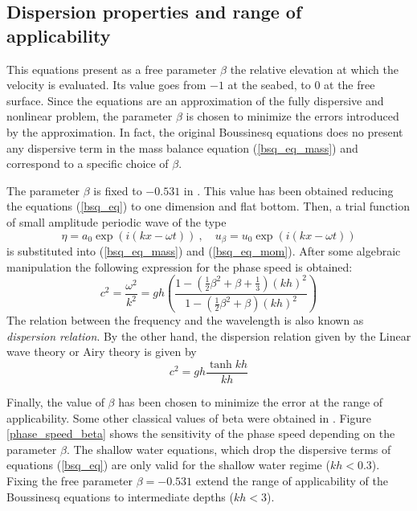 


\subsection{Dispersion properties and range of applicability}

This equations present as a free parameter $\beta$ the relative elevation at which the velocity is evaluated. Its value goes from $-1$ at the seabed, to $0$ at the free surface. Since the equations are an approximation of the fully dispersive and nonlinear problem, the parameter $\beta$ is chosen to minimize the errors introduced by the approximation.
In fact, the original Boussinesq equations does no present any dispersive term in the mass balance equation (\ref{bsq_eq_mass}) and correspond to a specific choice of $\beta$.

The parameter $\beta$ is fixed to $-0.531$ in \cite{nwogu1993}. This value has been obtained reducing the equations (\ref{bsq_eq}) to one dimension and flat bottom. Then, a trial function of small amplitude periodic wave of the type
\begin{equation*}
    \eta = a_0 \exp(i(kx-\omega t)) \ , \quad u_\beta = u_0 \exp(i(kx-\omega t))
\end{equation*}
is substituted into (\ref{bsq_eq_mass}) and (\ref{bsq_eq_mom}). After some algebraic manipulation the following expression for the phase speed is obtained:
\begin{equation}
c^2 = \frac{\omega^2}{k^2} = gh
    \left(\frac{
        1-\left(\frac{1}{2}\beta^2 + \beta + \frac{1}{3}\right)(kh)^2
    }{
        1-\left(\frac{1}{2}\beta^2 + \beta\right)(kh)^2
    }\right)
\end{equation}
The relation between the frequency and the wavelength is also known as \emph{dispersion relation}.
By the other hand, the dispersion relation given by the Linear wave theory or Airy theory is given by
\begin{equation}
c^2 = gh \frac{\tanh kh}{kh}
\end{equation}

Finally, the value of $\beta$ has been chosen to minimize the error at the range of applicability. Some other classical values of beta were obtained in \cite{madsen1991,murray1989}. Figure \ref{phase_speed_beta} shows the sensitivity of the phase speed depending on the parameter $\beta$. The shallow water equations, which drop the dispersive terms of equations (\ref{bsq_eq}) are only valid for the shallow water regime ($kh<0.3$). Fixing the free parameter $\beta=-0.531$ extend the range of applicability of the Boussinesq equations to intermediate depths ($kh<3$).

